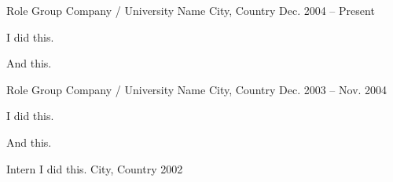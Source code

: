 
\begin{cventries}

  \cventry
    {Role {\enskip\cdotp\enskip} Group}
    {Company / University Name}
    {City, Country}
    {Dec. 2004 -- Present}
    {
      \begin{cvitems}
        \item {I did this.}
        \item {And this.}
      \end{cvitems}
    }

   \cventry
    {Role {\enskip\cdotp\enskip} Group}
    {Company / University Name}
    {City, Country}
    {Dec. 2003 -- Nov. 2004}
    {
      \begin{cvitems}
        \item {I did this.}
        \item {And this.}
      \end{cvitems}
    }

  \cventry
    {Intern}
    {I did this.}
    {City, Country}
    {2002}
    {}

\end{cventries}
